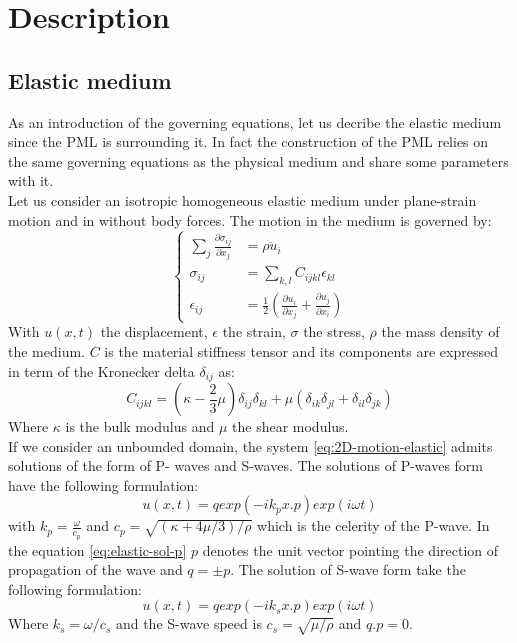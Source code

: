 \section{Description}

\subsection{Elastic medium}
As an introduction of the governing equations, let us decribe the elastic medium since the PML is surrounding it. In fact the construction of the PML relies on the same governing equations as the physical medium and share some parameters with it.\\
Let us consider an isotropic homogeneous elastic medium under plane-strain motion and in without body forces. The motion in the medium is governed by:
\begin{equation}
\begin{cases}
\sum_{j} \frac{\partial \sigma_{ij}}{\partial x_j} & =  \rho \ddot{u}_i \\
\sigma_{ij} &= \sum_{k,l} C_{ijkl} \epsilon_{kl} \\
\epsilon_{ij} &= \frac{1}{2} \left(\frac{\partial u_{i}}{\partial x_j} + \frac{\partial u_{j}}{\partial x_i} \right)
\end{cases}
\label{eq:2D-motion-elastic}
\end{equation} 
With $u(x,t)$ the displacement, $\epsilon$ the strain, $\sigma$ the stress, $\rho$ the mass density of the medium. $C$ is the material stiffness tensor and its components are expressed in term of the Kronecker delta $\delta_{ij}$ as:
\begin{equation}
C_{ijkl} = (\kappa-\frac{2}{3}\mu)\delta_{ij}\delta_{kl}+\mu(\delta_{ik}\delta_{jl} + \delta_{il} \delta_{jk})
\end{equation} 
Where $\kappa$ is the bulk modulus and $\mu$ the shear modulus.\\
If we consider an unbounded domain, the system \ref{eq:2D-motion-elastic} admits solutions of the form of P- waves and S-waves. The solutions of P-waves form have the following formulation: 
\begin{equation}
u(x,t) = q exp(-i k_p x . p) exp(i\omega t)
\label{eq:elastic-sol-p}
\end{equation}
with $k_p = \frac{\omega}{c_p}$ and $c_p = \sqrt{(\kappa+4\mu/3)/\rho}$ which is the celerity of the P-wave. In the equation \ref{eq:elastic-sol-p} $p$ denotes the unit vector pointing the direction of propagation of the wave and $q=\pm p$.   
The solution of S-wave form take the following formulation:
\begin{equation}
u(x,t) = q exp(-i k_s x.p) exp(i \omega t)
\end{equation}
Where $k_s = \omega / c_s$ and the S-wave speed is $c_s =\sqrt{ \mu/\rho}$ and $q.p =0$.
